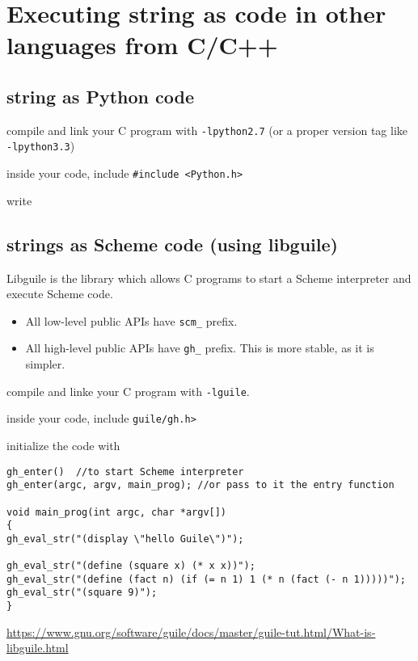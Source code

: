 \chapter{Executing string as code in other languages from C/C++}


\section{string as Python code}

compile and link your C program with \verb!-lpython2.7! (or a
proper version tag like \verb!-lpython3.3!)

inside your code, include \verb!#include <Python.h>!

write 



\section{strings as Scheme code (using libguile)}
\label{sec:libguile}

Libguile is the library which allows C programs to start a Scheme interpreter
and execute Scheme code. 
\begin{itemize} 
  \item All low-level public APIs have \verb!scm_! prefix.
  
  \item All high-level public APIs have \verb!gh_! prefix. This is more stable,
  as it is simpler.
\end{itemize} 

compile and linke your C program with \verb!-lguile!.


inside your code, include \verb!guile/gh.h>! 

initialize the code with 
\begin{verbatim}
gh_enter()  //to start Scheme interpreter
gh_enter(argc, argv, main_prog); //or pass to it the entry function
 
void main_prog(int argc, char *argv[])
{
gh_eval_str("(display \"hello Guile\")");

gh_eval_str("(define (square x) (* x x))");
gh_eval_str("(define (fact n) (if (= n 1) 1 (* n (fact (- n 1)))))");
gh_eval_str("(square 9)");
}      
\end{verbatim}




\url{https://www.gnu.org/software/guile/docs/master/guile-tut.html/What-is-libguile.html}